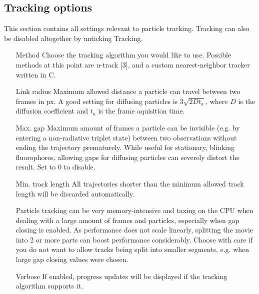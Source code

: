 \documentclass[11pt,onside]{report}
\makeatletter
\numberwithin{equation}{chapter}
\gdef\tshortstack{\@ifnextchar[\@tshortstack{\@tshortstack[c]}}
\gdef\@tshortstack[#1]{%
  \leavevmode
  \vtop\bgroup
    \baselineskip-\p@\lineskip 3\p@
    \let\mb@l\hss\let\mb@r\hss
    \expandafter\let\csname mb@#1\endcsname\relax
    \let\\\@stackcr
    \@ishortstack}
\def\CC{{C\nolinebreak[4]\hspace{-.05em}\raisebox{.4ex}{\tiny\bf ++}}}
\makeatother
\begin{document}
\subsection*{Tracking options}
This section contains all settings relevant to particle tracking. Tracking can also be disabled altogether by unticking \textsf{Tracking}.
\begin{itemize}[leftmargin=2cm]
\item[Method] Choose the tracking algorithm you would like to use. Possible methods at this point are \textsf{u-track} [3], and a custom nearest-neighbor tracker written in \CC.
\item [Link radius] Maximum allowed distance a particle can travel between two frames in px. A good setting for diffusing particles is $3\sqrt{2 D t_a}$, where $D$ is the diffusion coefficient and $t_a$ is the frame aquisition time.
\item [Max. gap] Maximum amount of frames a particle can be invisible (e.g. by entering a non-radiative triplet state) between two observations without ending the trajectory prematurely. While useful for stationary, blinking fluorophores, allowing gaps for diffusing particles can severely distort the result. Set to 0 to disable.
\item [Min. track length] All trajectories shorter than the minimum allowed track length will be discarded automatically. 
\item [\smash{\tshortstack[1]{Split movie\\into parts}}] Particle tracking can be very memory-intensive and taxing on the CPU when dealing with a large amount of frames and particles, especially when gap closing is enabled. As performance does not scale linearly, splitting the movie into 2 or more parts can boost performance considerably. Choose with care if you do not want to allow tracks being split into smaller segments, e.g. when large gap closing values were chosen.
\item [Verbose] If enabled, progress updates will be displayed if the tracking algorithm supports it.
\end{itemize}
\end{document}

